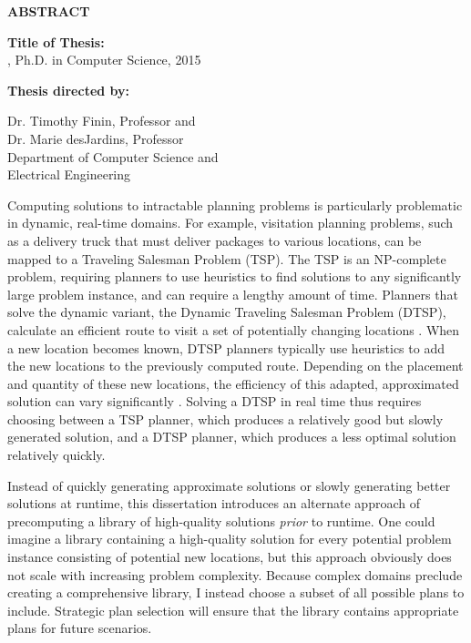 \newpage
\pagestyle{empty}

\begin{center}
\vspace{0.1in}
\large{\bf ABSTRACT} \par  
\bigskip \bigskip
\end{center}

\begin{flushleft}
{\bf Title of Thesis:} \thesistitle{}\\
\fullname{}, Ph.D. in Computer Science, 2015 \\
\begin{singlespace}
{\bf Thesis directed by:}{\hspace{2.5mm}} \parbox[t]{3in}{Dr. Timothy Finin, Professor and \\ Dr. Marie desJardins, Professor \\
Department of Computer Science and \\ Electrical Engineering}
\end{singlespace}
\end{flushleft}


Computing solutions to intractable planning problems is particularly problematic in dynamic, real-time domains.  For example, visitation planning problems, such as a delivery truck that must deliver packages to various locations, can be mapped to a Traveling Salesman Problem (TSP).  The TSP is an NP-complete problem, requiring planners to use heuristics to find solutions to any significantly large problem instance, and can require a lengthy amount of time.  Planners that solve the dynamic variant, the Dynamic Traveling Salesman Problem (DTSP), calculate an efficient route to visit a set of potentially changing locations \citep{psaraftis88dynamic}.  When a new location becomes known, DTSP planners typically use heuristics to add the new locations to the previously computed route.  Depending on the placement and quantity of these new locations, the efficiency of this adapted, approximated solution can vary significantly \citep{psaraftis95dynamic,laporte00classical,larsen2000dvrp}.  Solving a DTSP in real time thus requires choosing between a TSP planner, which produces a relatively good but slowly generated solution, and a DTSP planner, which produces a less optimal solution relatively quickly.

Instead of quickly generating approximate solutions or slowly generating better solutions at runtime, this dissertation introduces an alternate approach of precomputing a library of high-quality solutions \textit{prior} to runtime.  One could imagine a library containing a high-quality solution for every potential problem instance consisting of potential new locations, but this approach obviously does not scale with increasing problem complexity.  Because complex domains preclude creating a comprehensive library, I instead choose a subset of all possible plans to include. Strategic plan selection will ensure that the library contains appropriate plans for future scenarios.

